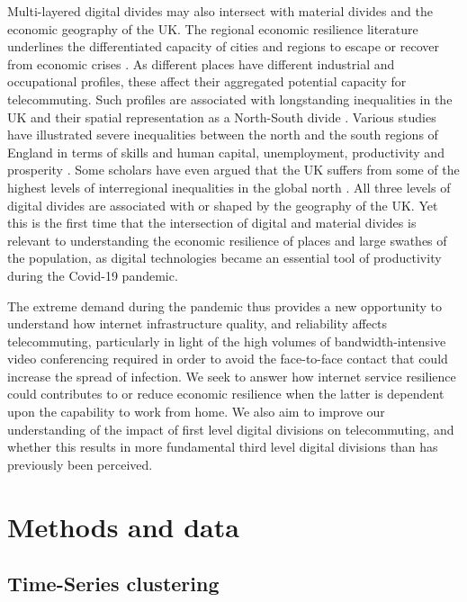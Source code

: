 \documentclass[]{interact}
\theoremstyle{plain}%
\theoremstyle{definition}
\theoremstyle{remark}
\begin{document}
Multi-layered digital divides may also intersect with material divides
and the economic geography of the UK. The regional economic resilience
literature underlines the differentiated capacity of cities and regions
to escape or recover from economic crises
\citep{martin2012regional, kitsos2018economic}. As different places have
different industrial and occupational profiles, these affect their
aggregated potential capacity for telecommuting. Such profiles are
associated with longstanding inequalities in the UK and their spatial
representation as a North-South divide \citep{martin_north_south}.
Various studies have illustrated severe inequalities between the north
and the south regions of England in terms of skills and human capital,
unemployment, productivity and prosperity
\citep{lee2014grim, mccann2020perceptions, dorling2018peak}. Some
scholars have even argued that the UK suffers from some of the highest
levels of interregional inequalities in the global north
\citep{gal2018reducing, mccann2016uk}. All three levels of digital
divides are associated with or shaped by the geography of the UK. Yet
this is the first time that the intersection of digital and material
divides is relevant to understanding the economic resilience of places
and large swathes of the population, as digital technologies became an
essential tool of productivity during the Covid-19 pandemic.

The extreme demand during the pandemic thus provides a new opportunity
to understand how internet infrastructure quality, and reliability
affects telecommuting, particularly in light of the high volumes of
bandwidth-intensive video conferencing required in order to avoid the
face-to-face contact that could increase the spread of infection. We
seek to answer how internet service resilience could contributes to or
reduce economic resilience when the latter is dependent upon the
capability to work from home. We also aim to improve our understanding
of the impact of first level digital divisions on telecommuting, and
whether this results in more fundamental third level digital divisions
than has previously been perceived.

\hypertarget{sec:3}{%
\section{Methods and data}\label{sec:3}}

\hypertarget{sec:3.1}{%
\subsection{Time-Series clustering}\label{sec:3.1}}
\end{document}
